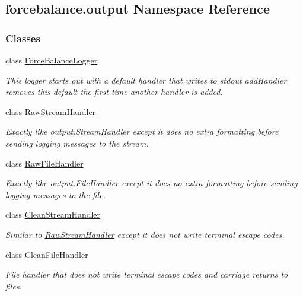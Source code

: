 \hypertarget{namespaceforcebalance_1_1output}{\subsection{forcebalance.\-output Namespace Reference}
\label{namespaceforcebalance_1_1output}
}
\subsubsection*{Classes}
\begin{DoxyCompactItemize}
\item 
class \hyperlink{classforcebalance_1_1output_1_1ForceBalanceLogger}{Force\-Balance\-Logger}
\begin{DoxyCompactList}\small\item\em This logger starts out with a default handler that writes to stdout add\-Handler removes this default the first time another handler is added. \end{DoxyCompactList}\item 
class \hyperlink{classforcebalance_1_1output_1_1RawStreamHandler}{Raw\-Stream\-Handler}
\begin{DoxyCompactList}\small\item\em Exactly like output.\-Stream\-Handler except it does no extra formatting before sending logging messages to the stream. \end{DoxyCompactList}\item 
class \hyperlink{classforcebalance_1_1output_1_1RawFileHandler}{Raw\-File\-Handler}
\begin{DoxyCompactList}\small\item\em Exactly like output.\-File\-Handler except it does no extra formatting before sending logging messages to the file. \end{DoxyCompactList}\item 
class \hyperlink{classforcebalance_1_1output_1_1CleanStreamHandler}{Clean\-Stream\-Handler}
\begin{DoxyCompactList}\small\item\em Similar to \hyperlink{classforcebalance_1_1output_1_1RawStreamHandler}{Raw\-Stream\-Handler} except it does not write terminal escape codes. \end{DoxyCompactList}\item 
class \hyperlink{classforcebalance_1_1output_1_1CleanFileHandler}{Clean\-File\-Handler}
\begin{DoxyCompactList}\small\item\em File handler that does not write terminal escape codes and carriage returns to files. \end{DoxyCompactList}\end{DoxyCompactItemize}
